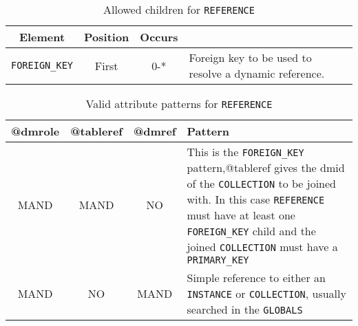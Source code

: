 \begin{table}[!htbp]
\small
\centering
\begin{tabulary}{\linewidth}{|c |c |c|J|}
    \hline 
        \textbf{Element} &
        \textbf{Position} &
        \textbf{Occurs} &
        \\
    \hline      \hline  
        \texttt{FOREIGN\_KEY}  &        
        First &           
        0-* &
        Foreign key to be used to resolve a dynamic reference.\\
    \hline 
\end{tabulary}
     \caption{Allowed children for \texttt{REFERENCE}} 
     \label{tbl:reference-chilren}
\end{table}


\begin{table}[!htbp]
\small
\centering
\begin{tabulary}{\linewidth}{|c|c|c|J|}
    \hline 
        \textbf{@dmrole} &
        \textbf{@tableref} &
        \textbf{@dmref} &
        \textbf{Pattern}\\
    \hline      \hline  
        MAND &           
        MAND &           
        NO &           
        This is the \texttt{FOREIGN\_KEY} pattern,@tableref gives the dmid of the \texttt{COLLECTION} to be joined with. In this case \texttt{REFERENCE} must have at least one \texttt{FOREIGN\_KEY} child and the joined \texttt{COLLECTION} must have a \texttt{PRIMARY\_KEY}\\
    \hline   
        MAND &           
        NO &           
        MAND &           
        Simple reference to either an \texttt{INSTANCE} or \texttt{COLLECTION}, usually searched in the \texttt{GLOBALS}\\
   \hline 
\end{tabulary}
     \caption{Valid attribute patterns for  \texttt{REFERENCE}}
     \label{tbl:reference-pattern}
\end{table}

